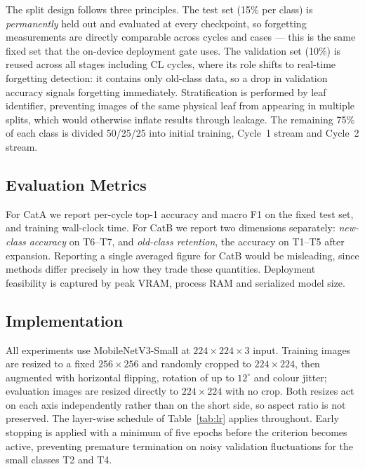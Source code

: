 \documentclass[journal]{IEEEtran}
\begin{document}
The split design follows three principles. The test set (15\% per class) is
\emph{permanently} held out and evaluated at every checkpoint, so forgetting
measurements are directly comparable across cycles and cases --- this is the same
fixed set that the on-device deployment gate uses. The validation set (10\%) is
reused across all stages including CL cycles, where its role shifts to real-time
forgetting detection: it contains only old-class data, so a drop in validation
accuracy signals forgetting immediately. Stratification is performed by leaf
identifier, preventing images of the same physical leaf from appearing in multiple
splits, which would otherwise inflate results through leakage. The remaining 75\% of
each class is divided 50/25/25 into initial training, Cycle~1 stream and Cycle~2
stream.

\subsection{Evaluation Metrics}

For CatA we report per-cycle top-1 accuracy and macro F1 on the fixed test set, and
training wall-clock time. For CatB we report two dimensions separately:
\emph{new-class accuracy} on T6--T7, and \emph{old-class retention}, the accuracy on
T1--T5 after expansion. Reporting a single averaged figure for CatB would be
misleading, since methods differ precisely in how they trade these quantities.
Deployment feasibility is captured by peak VRAM, process RAM and serialized model
size.

\subsection{Implementation}

All experiments use MobileNetV3-Small at $224\times224\times3$ input. Training images
are resized to a fixed $256\times256$ and randomly cropped to $224\times224$, then
augmented with horizontal flipping, rotation of up to $12^\circ$ and colour jitter;
evaluation images are resized directly to $224\times224$ with no crop. Both resizes
act on each axis independently rather than on the short side, so aspect ratio is not
preserved. The layer-wise schedule of Table~\ref{tab:lr} applies throughout. Early stopping is applied with a minimum of five epochs before
the criterion becomes active, preventing premature termination on noisy validation
fluctuations for the small classes T2 and T4.
\end{document}
